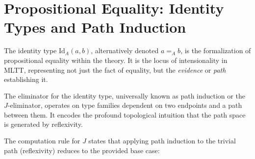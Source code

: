 \section{Propositional Equality: Identity Types and Path Induction}

The identity type $\mathrm{Id}_A(a, b)$, alternatively denoted $a =_A b$, is the formalization of propositional equality within the theory. It is the locus of intensionality in MLTT, representing not just the fact of equality, but the \emph{evidence} or \emph{path} establishing it.

\begin{definition}
\begin{mathpar}

\end{mathpar}

The eliminator for the identity type, universally known as path induction or the $J$-eliminator, operates on type families dependent on two endpoints and a path between them. It encodes the profound topological intuition that the path space is generated by reflexivity.
\begin{mathpar}
\end{mathpar}

The computation rule for $J$ states that applying path induction to the trivial path (reflexivity) reduces to the provided base case:
\begin{mathpar}
\end{mathpar}
\end{definition}

